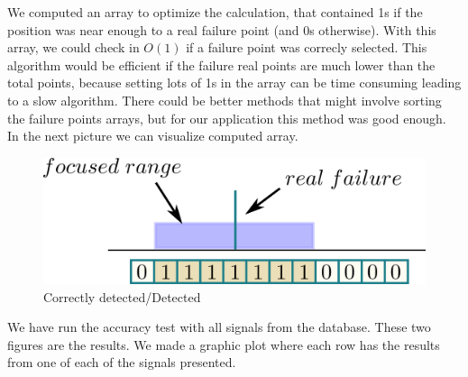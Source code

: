 \documentclass[conference]{IEEEtran}
\begin{document}
We computed an array to optimize the calculation, that contained 1s if the position was near enough to a real failure point (and 0s otherwise). With this array, we could check in $O(1)$ if a failure point was correcly selected. This algorithm would be efficient if the failure real points are much lower than the total points, because setting lots of 1s in the array can be time consuming leading to a slow algorithm. There could be better methods that might involve sorting the failure points arrays, but for our application this method was good enough. In the next picture we can visualize computed array.

\begin{figure}[H]
\centerline{\includegraphics[scale=0.8]{imagenes/arrayExplain.png}}
\caption{Correctly detected/Detected}
\label{fig}
\end{figure}


We have run the accuracy test with all signals from the database.
These two figures are the results. We made a graphic plot where each row has the results from one of each of the signals presented.
\end{document}
